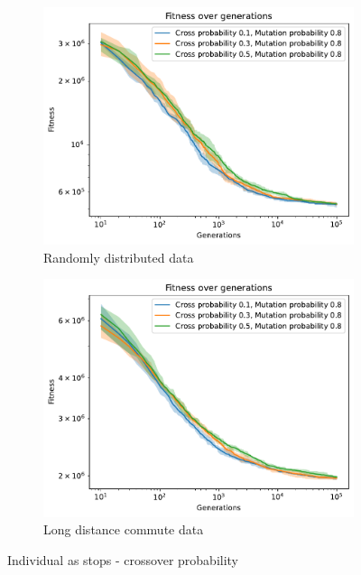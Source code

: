 \begin{figure}[b]
    \centering
    \begin{subfigure}[b]{0.45\textwidth}
        \includegraphics[width=\textwidth]{img/evo1_cross_prob_random.pdf}
        \caption{Randomly distributed data}
        \label{fig:evo1_cross_random}
    \end{subfigure}
    \begin{subfigure}[b]{0.45\textwidth}
        \includegraphics[width=\textwidth]{img/evo1_cross_prob_commute.pdf}
        \caption{Long distance commute data}
        \label{fig:evo1_cross_commute}
    \end{subfigure}
    \caption{Individual as stops - crossover probability}
    \label{fig:evo1_cross}
\end{figure}

